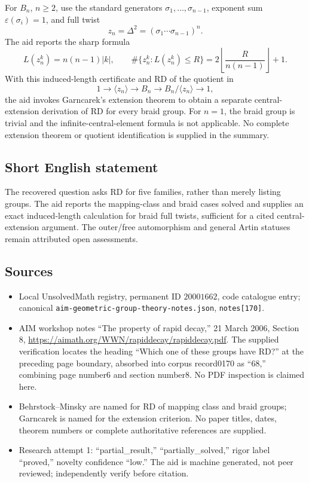 \documentclass[11pt]{article}
\begin{document}
For \(B_n\), \(n\geq2\), use the standard generators \(\sigma_1,\ldots,\sigma_{n-1}\), exponent sum \(\varepsilon(\sigma_i)=1\), and full twist
\[
 z_n=\Delta^2=(\sigma_1\cdots\sigma_{n-1})^n.
\]
The aid reports the sharp formula
\[
 L(z_n^k)=n(n-1)|k|,\qquad
 \#\{z_n^k:L(z_n^k)\leq R\}
 =2\left\lfloor\frac{R}{n(n-1)}\right\rfloor+1.
\]
With this induced-length certificate and RD of the quotient in
\[
 1\to\langle z_n\rangle\to B_n\to B_n/\langle z_n\rangle\to1,
\]
the aid invokes Garncarek's extension theorem to obtain a separate central-extension derivation of RD for every braid group. For \(n=1\), the braid group is trivial and the infinite-central-element formula is not applicable. No complete extension theorem or quotient identification is supplied in the summary.
\subsection{Short English statement}
The recovered question asks RD for five families, rather than merely listing groups. The aid reports the mapping-class and braid cases solved and supplies an exact induced-length calculation for braid full twists, sufficient for a cited central-extension argument. The outer/free automorphism and general Artin statuses remain attributed open assessments.
\subsection{Sources}
\begin{itemize}
\item Local UnsolvedMath registry, permanent ID \(20001662\), code catalogue entry; canonical \texttt{aim-geometric-group-theory-notes.json}, \texttt{notes[170]}.
\item AIM workshop notes ``The property of rapid decay,'' 21 March 2006, Section 8, \url{https://aimath.org/WWN/rapiddecay/rapiddecay.pdf}. The supplied verification locates the heading ``Which one of these groups have RD?'' at the preceding page boundary, absorbed into corpus record0170 as ``68,'' combining page number6 and section number8. No PDF inspection is claimed here.
\item Behrstock--Minsky are named for RD of mapping class and braid groups; Garncarek is named for the extension criterion. No paper titles, dates, theorem numbers or complete authoritative references are supplied.
\item Research attempt 1: ``partial\_result,'' ``partially\_solved,'' rigor label ``proved,'' novelty confidence ``low.'' The aid is machine generated, not peer reviewed; independently verify before citation.
\end{itemize}
\end{document}
